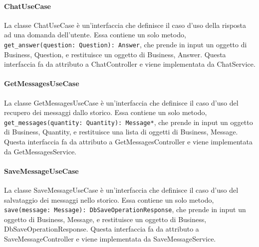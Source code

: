 \label{sec:use_case}

\paragraph{ChatUseCase}
\label{sec:chat_use_case}
La classe ChatUseCase è un'interfaccia che definisce il caso d'uso della risposta ad una domanda dell'utente. Essa contiene un solo metodo, \texttt{get\_answer(question: Question): Answer}, che prende in input un oggetto di Business, Question, e restituisce un oggetto di Business, Answer. Questa interfaccia fa da attributo a ChatController e viene implementata da ChatService.

\paragraph{GetMessagesUseCase}
\label{sec:get_messages_use_case}
La classe GetMessagesUseCase è un'interfaccia che definisce il caso d'uso del recupero dei messaggi dallo storico. Essa contiene un solo metodo, \texttt{get\_messages(quantity: Quantity): Message*}, che prende in input un oggetto di Business, Quantity, e restituisce una lista di oggetti di Business, Message. Questa interfaccia fa da attributo a GetMessagesController e viene implementata da GetMessagesService.

\paragraph{SaveMessageUseCase}
\label{sec:save_message_use_case}
La classe SaveMessageUseCase è un'interfaccia che definisce il caso d'uso del salvataggio dei messaggi nello storico. Essa contiene un solo metodo, \texttt{save(message: Message): DbSaveOperationResponse}, che prende in input un oggetto di Business, Message, e restituisce un oggetto di Business, DbSaveOperationResponse. Questa interfaccia fa da attributo a SaveMessageController e viene implementata da SaveMessageService.


\label{sec:service_backend}

